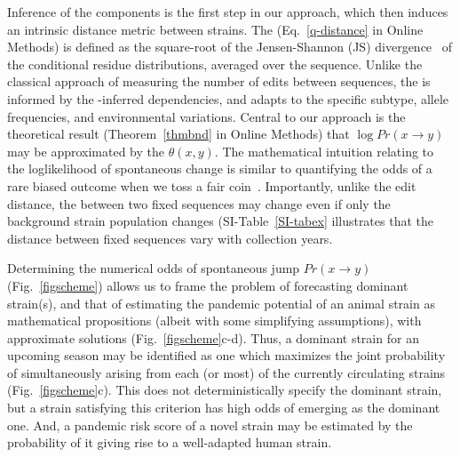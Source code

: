 \documentclass[onecolumn, compsoc,10pt]{IEEEtran}
\def\METHODS{Online Methods\xspace}
\begin{document}
Inference of the \enet components is the first step in our approach, which then induces  an intrinsic distance metric between strains. The \qdist  (Eq.~\eqref{q-distance} in \METHODS) is defined as the square-root of the Jensen-Shannon (JS) divergence~\cite{cover} of the conditional residue distributions, averaged over the sequence. Unlike the classical approach of measuring the number of edits between sequences, the \qdist is informed by the \enet-inferred  dependencies, and adapts to the specific subtype, allele frequencies, and environmental variations. Central to our approach is the theoretical result (Theorem~\ref{thmbnd} in \METHODS) that   $\log Pr(x \rightarrow y )$   may be approximated by the  \qdist $\theta(x,y)$. The mathematical intuition  relating  \qdist  to the loglikelihood of spontaneous change  is similar to quantifying the  odds of  a rare biased outcome when we  toss a fair coin~\cite{varadhan2010large}. %
Importantly, unlike the edit distance, the \qdist  between two fixed sequences may change even if only the background strain population changes (SI-Table~\ref{SI-tabex} illustrates that  the distance between  fixed  sequences vary with collection years.%


Determining the numerical odds of spontaneous jump $ Pr(x \rightarrow y)$ (Fig.~\ref{figscheme}) allows us to frame the problem of forecasting  dominant strain(s), and that of estimating the  pandemic potential of an animal strain as  mathematical propositions (albeit with some simplifying assumptions), with  approximate solutions (Fig.~\ref{figscheme}c-d). Thus,  a dominant strain for an upcoming  season may be identified as one which maximizes the joint probability of simultaneously arising from each (or most)  of the currently circulating strains (Fig.~\ref{figscheme}c).  This does not deterministically specify the dominant strain, but a strain satisfying this criterion  has  high odds of emerging as the dominant one. And, a pandemic risk score of a novel strain may be estimated by the probability of it giving rise to a well-adapted human strain.  %
\end{document}
